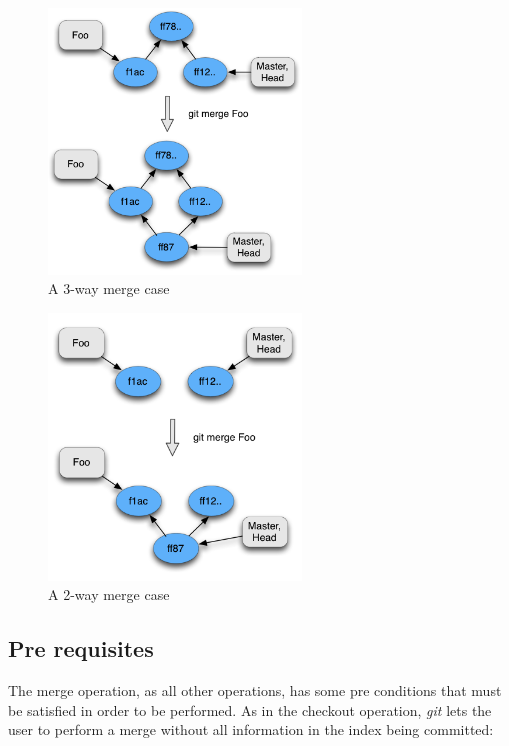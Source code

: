 \begin{figure}[tp]
   \centering
   \includegraphics[width=0.6\textwidth]{images/3merge.png}
   \caption{A 3-way merge case}\label{fig:3mergecase}
\end{figure}

\begin{figure}[tp]
   \centering
   \includegraphics[width=0.6\textwidth]{images/2merge.png}
   \caption{A 2-way merge case}\label{fig:2mergecase}
\end{figure}

\subsection{Pre requisites}
The merge operation, as all other operations, has some pre conditions that
must be satisfied in order to be performed. As in the checkout operation,
\emph{git} lets the user to perform a merge without all information in the index 
being committed: 

